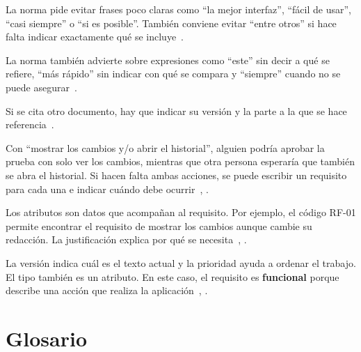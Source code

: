 \documentclass[11pt,a4paper]{article}
\begin{document}
La norma pide evitar frases poco claras como ``la mejor interfaz'', ``fácil
de usar'', ``casi siempre'' o ``si es posible''. También conviene evitar
``entre otros'' si hace falta indicar exactamente qué se incluye~\cite[Sec. 5.2.7]{iso29148}.

La norma también advierte sobre expresiones como ``este'' sin decir a qué se
refiere, ``más rápido'' sin indicar con qué se compara y ``siempre'' cuando
no se puede asegurar~\cite[Sec. 5.2.7]{iso29148}.

Si se cita otro documento, hay que indicar su versión y la parte a la que se
hace referencia~\cite[Sec. 5.2.7]{iso29148}.

Con ``mostrar los cambios y/o abrir el historial'', alguien podría aprobar
la prueba con solo ver los cambios, mientras que otra persona esperaría que
también se abra el historial. Si hacen falta ambas acciones, se puede
escribir un requisito para cada una e indicar cuándo debe ocurrir~\cite[Sec. 5.2.5]{iso29148}, \cite[Sec. 5.2.7]{iso29148}.

Los atributos son datos que acompañan al requisito. Por ejemplo, el código
RF-01 permite encontrar el requisito de mostrar los cambios aunque cambie su
redacción. La justificación explica por qué se necesita~\cite[Sec. 5.2.8.1]{iso29148}, \cite[Sec. 5.2.8.2]{iso29148}.

La versión indica cuál es el texto actual y la prioridad ayuda a ordenar el
trabajo. El tipo también es un atributo. En este caso, el requisito es
\textbf{funcional} porque describe una acción que realiza la
aplicación~\cite[Sec. 5.2.8.2]{iso29148}, \cite[Sec. 5.2.8.3]{iso29148}.

\section{Glosario}
\end{document}
